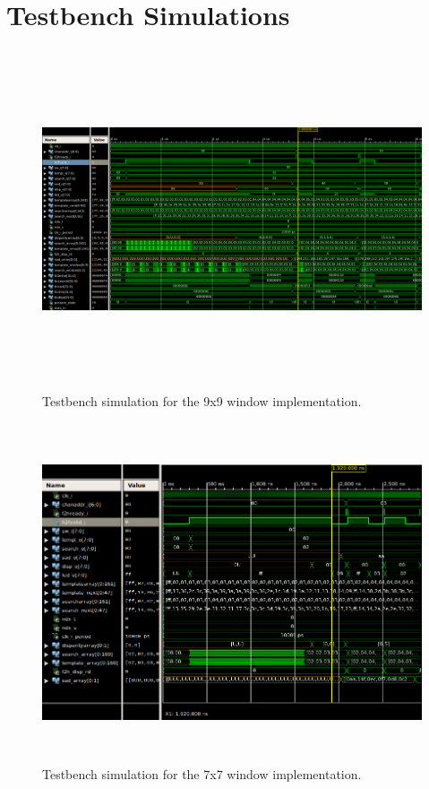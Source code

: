 \chapter{Testbench Simulations}
\label{sec:appdxD}

\begin{figure}
	\begin{center}
		\includegraphics[height=100mm]{figures/testbench_9x9_clock.png}%
		\captionfonts
		\caption{Testbench simulation for the 9x9 window implementation.}
		\label{fig:tb_9x9}
	\end{center}
\end{figure}


\begin{figure}
	\begin{center}
		\includegraphics[height=100mm]{figures/testbench_simulation_7x7.png}
		\captionfonts
		\caption{Testbench simulation for the 7x7 window implementation.}
		\label{fig:tb_7x7}
	\end{center}
\end{figure}
